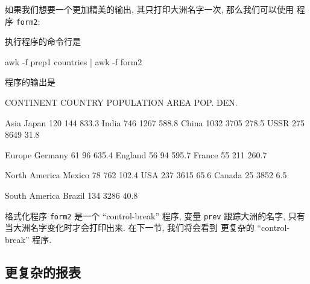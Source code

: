 如果我们想要一个更加精美的输出, 其只打印大洲名字一次, 那么我们可以使用
程序 \verb'form2':
执行程序的命令行是
\begin{awkcode}
    awk -f prep1 countries | awk -f form2
\end{awkcode}
程序的输出是
\begin{awkcode}
    CONTINENT       COUNTRY    POPULATION    AREA    POP. DEN.

    Asia            Japan          120        144      833.3
                    India          746       1267      588.8
                    China         1032       3705      278.5
                    USSR           275       8649       31.8

    Europe          Germany         61         96      635.4
                    England         56         94      595.7
                    France          55        211      260.7

    North America   Mexico          78        762      102.4
                    USA            237       3615       65.6
                    Canada          25       3852        6.5

    South America   Brazil         134       3286       40.8
\end{awkcode}

格式化程序 \verb'form2' 是一个 ``control-break'' 程序, 变量 \verb'prev'
跟踪大洲的名字, 只有当大洲名字变化时才会打印出来. 在下一节, 我们将会看到
更复杂的 ``control-break'' 程序.

\subsection{更复杂的报表}
\label{subsec:a_more_complex_report}


